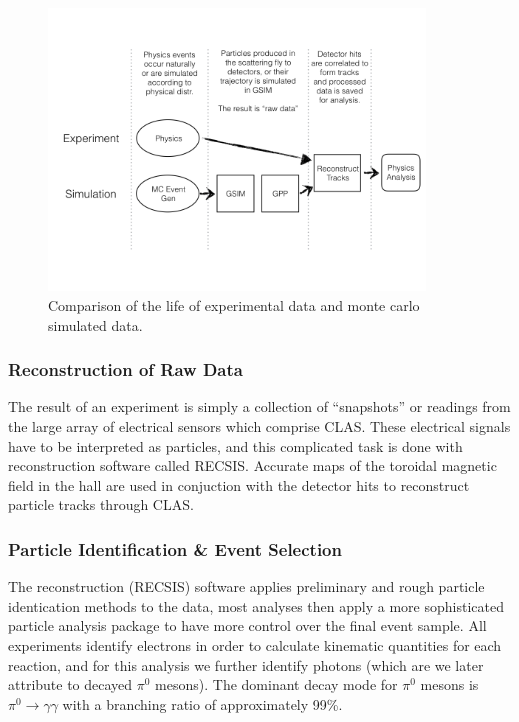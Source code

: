\begin{figure}
  \centering
  \includegraphics[width=10cm]{image/dataflowchart.png}
  \caption{Comparison of the life of experimental data and monte carlo simulated data.}
  \label{fig:dataflow}
\end{figure}

\subsubsection{Reconstruction of Raw Data}
The result of an experiment is simply a collection of ``snapshots'' or readings from the large array of electrical sensors which comprise CLAS.  These electrical signals have to  be interpreted as particles, and this complicated task is done with reconstruction software called RECSIS.  Accurate maps of the toroidal magnetic field in the hall are used in conjuction with the detector hits to reconstruct particle tracks through CLAS.  \\

\subsubsection{Particle Identification \& Event Selection}
The reconstruction (RECSIS) software applies preliminary and rough particle identication methods to the data, most analyses then apply a more sophisticated particle analysis package to have more control over the final event sample.  All experiments identify electrons in order to calculate kinematic quantities for each reaction, and for this analysis we further identify photons (which are we later attribute to decayed $\pi^{0}$ mesons).  The dominant decay mode for $\pi^0$ mesons is $\pi^{0} \rightarrow \gamma \gamma$ with a branching ratio of approximately 99\%. \\

